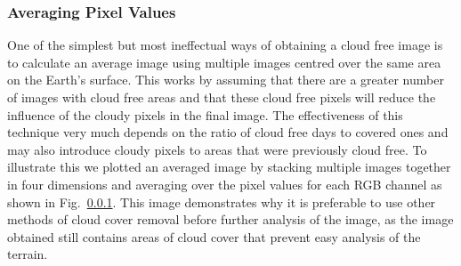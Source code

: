 \subsubsection{Averaging Pixel Values}
 One of the simplest but most ineffectual ways of obtaining a cloud free image is to calculate an average image using multiple images centred over the same area on the Earth's surface. This works by assuming that there are a greater number of images with cloud free areas and that these cloud free pixels will reduce the influence of the cloudy pixels in the final image. The effectiveness of this technique very much depends on the ratio of cloud free days to covered ones and may also introduce cloudy pixels to areas that were previously cloud free. To illustrate this we plotted an averaged image by stacking multiple images together in four dimensions and averaging over the pixel values for each RGB channel as shown in Fig.~\ref{}. This image demonstrates why it is preferable to use other methods of cloud cover removal before further analysis of the image, as the image obtained still contains areas of cloud cover that prevent easy analysis of the terrain.
